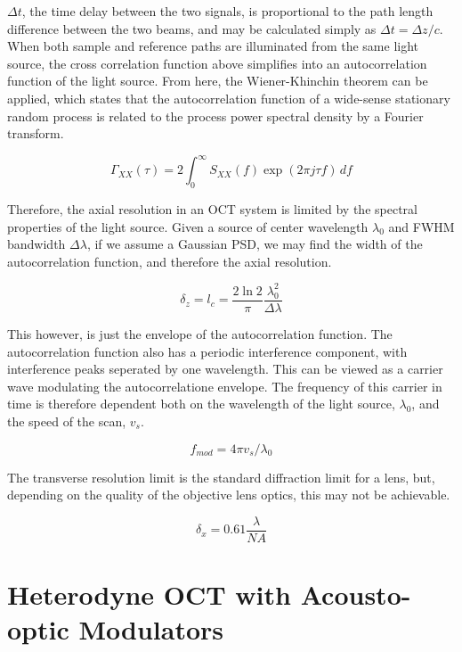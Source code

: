 $\Delta t$, the time delay between the two signals, is proportional to the path length difference between the two beams, and may be calculated simply as $\Delta t = \Delta z / c$. When both sample and reference paths are illuminated from the same light source, the cross correlation function above simplifies into an autocorrelation function of the light source. From here, the Wiener-Khinchin theorem can be applied, which states that the autocorrelation function of a wide-sense stationary random process is related to the process power spectral density by a Fourier transform.

\begin{equation}
\Gamma_{XX}(\tau) = 2 \int_{0}^\infty S_{XX}(f) \exp(2 \pi j \tau f) \,df
\end{equation}

Therefore, the axial resolution in an OCT system is limited by the spectral properties of the light source. Given a source of center wavelength $\lambda_0$ and FWHM bandwidth $\Delta \lambda$, if we assume a Gaussian PSD, we may find the width of the autocorrelation function, and therefore the axial resolution. \cite{fercher}

\begin{equation} \label{eq:ares}
\delta_z = l_c = \frac{2 \ln{2}}{\pi} \frac{\lambda_0^2}{\Delta \lambda}
\end{equation}

This however, is just the envelope of the autocorrelation function. The autocorrelation function also has a periodic interference component, with interference peaks seperated by one wavelength. This can be viewed as a carrier wave modulating the autocorrelatione envelope. The frequency of this carrier in time is therefore dependent both on the wavelength of the light source, $\lambda_0$, and the speed of the scan, $v_s$. \cite{fercher}

\begin{equation} \label{eq:carrier}
f_{mod} = 4 \pi v_s / \lambda_0
\end{equation}

The transverse resolution limit is the standard diffraction limit for a lens, but, depending on the quality of the objective lens optics, this may not be achievable. \cite{hecht}

\begin{equation} \label{eq:tres}
\delta_x = 0.61 \frac{\lambda}{NA}
\end{equation}

\section{Heterodyne OCT with Acousto-optic Modulators}

